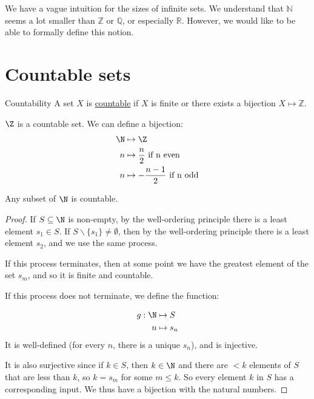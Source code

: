 \documentclass[../Main.tex]{subfiles}
\begin{document}
We have a vague intuition for the sizes of infinite sets. We understand that $\mathbb{N}$ seems a lot smaller than $\mathbb{Z}$ or $\mathbb{Q}$, or especially $\mathbb{R}$. However, we would like to be able to formally define this notion.
\section{Countable sets}
\begin{definition}{Countability}
    A set $X$ is \underline{countable} if $X$ is finite or there exists a bijection $X \mapsto \mathbb{Z}$.
\end{definition}
\begin{example}
    $\Z$ is a countable set. We can define a bijection:
    \begin{align*}
        \N &\mapsto \Z \\
        n &\mapsto \frac{n}{2} \text{ if n even}\\
        n &\mapsto -\frac{n-1}{2} \text{ if n odd}
    \end{align*}
\end{example}
\begin{lemma}
    Any subset of $\N$ is countable.
    \label{lemCountableNaturalSubset}
\end{lemma}
\begin{proof}
    If $S \subseteq \N$ is non-empty, by the well-ordering principle there is a least element $s_1 \in S$. If $S \backslash \{s_1\} \neq \emptyset$, then by the well-ordering principle there is a least element $s_2$, and we use the same process.\par
    If this process terminates, then at some point we have the greatest element of the set $s_m$, and so it is finite and countable.\par
    If this process does not terminate, we define the function:\par
    \begin{align*}
        g : \N &\mapsto S \\
        n &\mapsto s_n
    \end{align*}
    It is well-defined (for every $n$, there is a unique $s_n$), and is injective.\par
    It is also surjective since if $k \in S$, then $k \in \N$ and there are $<k$ elements of $S$ that are less than $k$, so $k = s_m$ for some $m \leq k$. So every element $k$ in $S$ has a corresponding input. We thus have a bijection with the natural numbers.
\end{proof}
\end{document}
